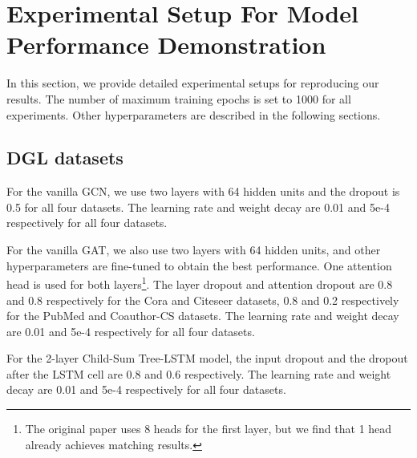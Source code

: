 \documentclass[lettersize,journal]{IEEEtran}
\theoremstyle{plain}
\theoremstyle{definition}
\theoremstyle{remark}
\begin{document}
\section{Experimental Setup For Model Performance Demonstration}
\label{exp_setup}

In this section, we provide detailed experimental setups for reproducing our results. The number of maximum training epochs is set to 1000 for all experiments. Other hyperparameters are described in the following sections.

\subsection{DGL datasets}
For the vanilla GCN, we use two layers with 64 hidden units and the dropout is 0.5 for all four datasets. The learning rate and weight decay are 0.01 and 5e-4 respectively for all four datasets. 

For the vanilla GAT, we also use two layers with 64 hidden units, and other hyperparameters are fine-tuned to obtain the best performance. One attention head is used for both layers\footnote{The original paper \citep{DBLP:conf/iclr/VelickovicCCRLB18} uses 8 heads for the first layer, but we find that 1 head already achieves matching results.}. The layer dropout and attention dropout are 0.8 and 0.8 respectively for the Cora and Citeseer datasets, 0.8 and 0.2 respectively for the PubMed and Coauthor-CS datasets. The learning rate and weight decay are 0.01 and 5e-4 respectively for all four datasets. 

For the 2-layer Child-Sum Tree-LSTM model, the input dropout and the dropout after the LSTM cell are 0.8 and 0.6 respectively. The learning rate and weight decay are 0.01 and 5e-4 respectively for all four datasets. 
\end{document}
